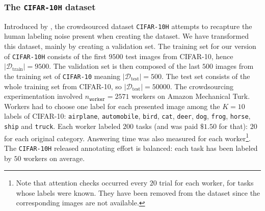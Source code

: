 \subsubsection{The \texttt{CIFAR-10H} dataset}
\label{subsubsec:cifar-10h_dataset}
Introduced by \citet{peterson_human_2019}, the crowdsourced dataset \texttt{CIFAR-10H} attempts to recapture the human labeling noise present when creating the dataset.
We have transformed this dataset, mainly by creating a validation set.
The training set for our version of \texttt{CIFAR-10H} consists of the first $9500$ test images from CIFAR-10, hence
$|\mathcal{D}_{\text{train}}| = 9500$.
The validation set is then composed of the last $500$ images from the training set of \texttt{CIFAR-10} meaning  $|\mathcal{D}_{\text{test}}| = 500 $.
The test set consists of the whole training set from CIFAR-10, so  $|\mathcal{D}_{\text{test}}| = 50000$.
The crowdsourcing experimentation involved $n_\texttt{worker}=2571$ workers on Amazon Mechanical Turk.
Workers had to choose one label for each presented image among the $K=10$ labels of CIFAR-10: \texttt{airplane}, \texttt{automobile}, \texttt{bird}, \texttt{cat}, \texttt{deer}, \texttt{dog}, \texttt{frog}, \texttt{horse}, \texttt{ship} and \texttt{truck}.
Each worker labeled $200$ tasks (and was paid $\$1.50$ for that): $20$ for each original category.
Answering time was also measured for each worker\footnote{Note that attention checks occurred every $20$ trial for each worker, for tasks whose labels were known.
They have been removed from the dataset since the corresponding images are not available.}.
The \texttt{CIFAR-10H} released annotating effort is balanced: each task has been labeled by $50$ workers on average.
